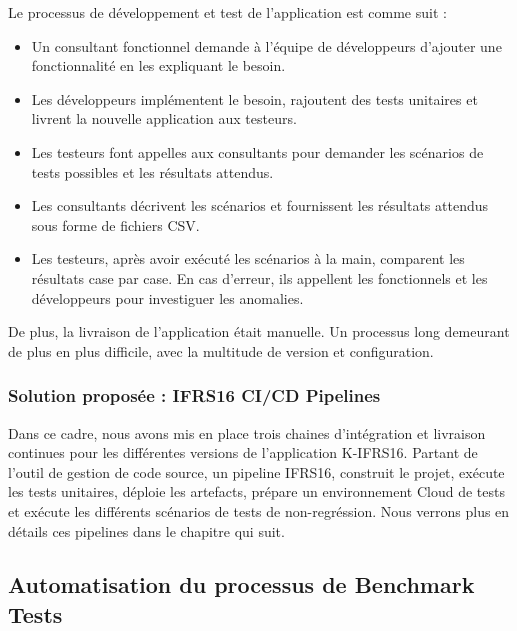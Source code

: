 \begin{spacing}{1.2}
Le processus de développement et test de l'application est comme suit : 
\begin{itemize}
\setlength\itemsep{0em}
    \item Un consultant fonctionnel demande à l'équipe de développeurs d'ajouter une fonctionnalité en les expliquant le besoin.
    \item Les développeurs implémentent le besoin, rajoutent des tests unitaires et livrent la nouvelle application aux testeurs.
    \item Les testeurs font appelles aux consultants pour demander les scénarios de tests possibles et les résultats attendus.
    \item Les consultants décrivent les scénarios et fournissent les résultats attendus sous forme de fichiers CSV.
    \item Les testeurs, après avoir exécuté les scénarios à la main, comparent les résultats case par case. En cas d'erreur, ils appellent les fonctionnels et les développeurs pour investiguer les anomalies.
\end{itemize}
De plus, la livraison de l'application était manuelle. Un processus long demeurant de plus en plus difficile, avec la multitude de version et configuration.
\subsubsection{Solution proposée : IFRS16 CI/CD Pipelines}
Dans ce cadre, nous avons mis en place trois chaines d'intégration et livraison continues pour les différentes versions de l'application K-IFRS16. Partant de l'outil de gestion de code source, un pipeline IFRS16, construit le projet, exécute les tests unitaires, déploie les artefacts, prépare un environnement Cloud de tests et exécute les différents scénarios de tests de non-regréssion. Nous verrons plus en détails ces pipelines dans le chapitre qui suit. 
\subsection{Automatisation du processus de Benchmark Tests}

\end{spacing}
